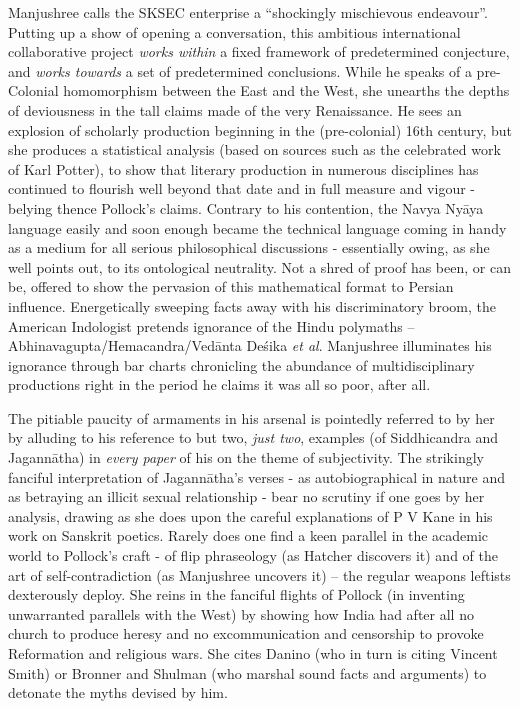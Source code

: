 Manjushree calls the SKSEC enterprise a “shockingly mischievous endeavour”. Putting up a show of opening a conversation, this ambitious international collaborative project {\sl works within} a fixed framework of predetermined conjecture, and {\sl works towards} a set of predetermined conclusions. While he speaks of a pre-Colonial homomorphism between the East and the West, she unearths the depths of deviousness in the tall claims made of the very Renaissance. He sees an explosion of scholarly production beginning in the (pre-colonial) 16th century, but she produces a statistical analysis (based on sources such as the celebrated work of Karl Potter), to show that literary production in numerous disciplines has continued to flourish well beyond that date and in full measure and vigour - belying thence Pollock's claims. Contrary to his contention, the Navya Nyāya language easily and soon enough became the technical language coming in handy as a medium for all serious philosophical discussions - essentially owing, as she well points out, to its ontological neutrality. Not a shred of proof has been, or can be, offered to show the pervasion of this mathematical format to Persian influence. Energetically sweeping facts away with his discriminatory broom, the American Indologist pretends ignorance of the Hindu polymaths -- Abhinavagupta/Hemacandra/Vedānta Deśika {\sl et al}. Manjushree illuminates his ignorance through bar charts chronicling the abundance of multidisciplinary productions right in the period he claims it was all so poor, after all.

The pitiable paucity of armaments in his arsenal is pointedly referred to by her by alluding to his reference to but two, {\sl just two}, examples (of Siddhicandra and Jagannātha) in {\sl every paper} of his on the theme of subjectivity. The strikingly fanciful interpretation of Jagannātha’s verses - as autobiographical in nature and as betraying an illicit sexual relationship - bear no scrutiny if one goes by her analysis, drawing as she does upon the careful explanations of P V Kane in his work on Sanskrit poetics. Rarely does one find a keen parallel in the academic world to Pollock’s craft - of flip phraseology (as Hatcher discovers it) and of the art of self-contradiction (as Manjushree uncovers it) -- the regular weapons leftists dexterously deploy. She reins in the fanciful flights of Pollock (in inventing unwarranted parallels with the West) by showing how India had after all no church to produce heresy and no excommunication and censorship to provoke Reformation and religious wars. She cites Danino (who in turn is citing Vincent Smith) or Bronner and Shulman (who marshal sound facts and arguments) to detonate the myths devised by him. 
\vskip 10pt

